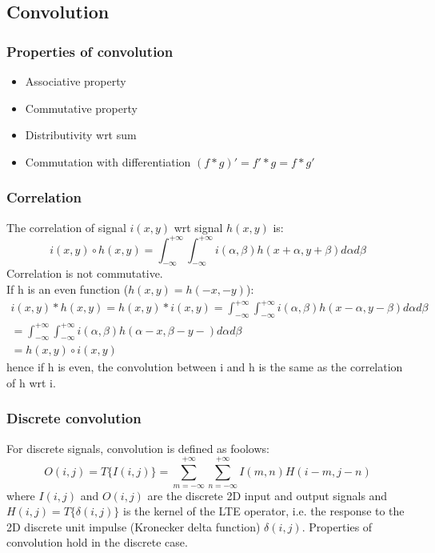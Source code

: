 \documentclass{article}
\begin{document}
\subsection{Convolution}
\subsubsection{Properties of convolution}
\begin{itemize}
    \item Associative property
    \item Commutative property
    \item Distributivity wrt sum
    \item Commutation with differentiation $(f*g)'=f'*g=f*g'$
\end{itemize}
\subsubsection{Correlation}
The correlation of signal $i(x,y)$ wrt signal $h(x,y)$ is:
$$i(x,y)\circ h(x,y) = \int_{-\infty}^{+\infty} \int_{-\infty}^{+\infty} i(\alpha,\beta)h(x+\alpha,y+\beta)d\alpha d\beta$$
Correlation is not commutative.\\
If h is an even function ($h(x,y)=h(-x,-y)$):
\begin{gather*}
    i(x,y)*h(x,y)=h(x,y)*i(x,y)=\int_{-\infty}^{+\infty} \int_{-\infty}^{+\infty} i(\alpha,\beta)h(x-\alpha,y-\beta)d\alpha d\beta\\
    = \int_{-\infty}^{+\infty} \int_{-\infty}^{+\infty} i(\alpha,\beta)h(\alpha-x,\beta-y-)d\alpha d\beta\\
    = h(x,y) \circ i(x,y)
\end{gather*}
hence if h is even, the convolution between i and h is the same as the correlation of h wrt i.
\subsubsection{Discrete convolution}
For discrete signals, convolution is defined as foolows:
\begin{equation}
    O(i,j)=T\{I(i,j)\}=\sum_{m=-\infty}^{+\infty} \sum_{n=-\infty}^{+\infty} I(m,n)H(i-m,j-n)
\end{equation}
where $I(i,j)$ and $O(i,j)$ are the discrete 2D input and output signals and $H(i,j)=T\{\delta(i,j)\}$ is the kernel of the LTE operator, i.e. the response to the 2D discrete unit impulse (Kronecker delta function) $\delta(i,j)$. Properties of convolution hold in the discrete case.
\end{document}
